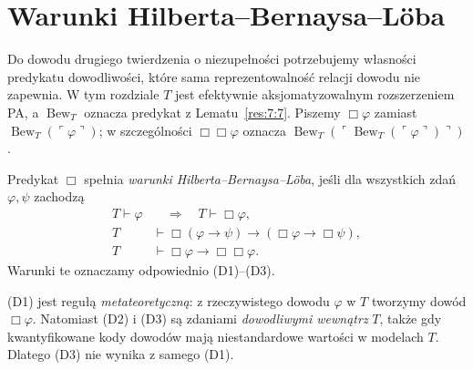 \section{Warunki Hilberta--Bernaysa--Löba}\label{sec:warunki-hbl}
Do dowodu drugiego twierdzenia o niezupełności potrzebujemy własności predykatu dowodliwości, które sama reprezentowalność relacji dowodu nie zapewnia. W tym rozdziale $T$ jest efektywnie aksjomatyzowalnym rozszerzeniem PA, a $\operatorname{Bew}_T$ oznacza predykat z Lematu~\ref{res:7:7}. Piszemy $\Box\varphi$ zamiast $\operatorname{Bew}_T(\ulcorner\varphi\urcorner)$; w szczególności $\Box\Box\varphi$ oznacza $\operatorname{Bew}_T(\ulcorner\operatorname{Bew}_T(\ulcorner\varphi\urcorner)\urcorner)$.

\begin{definicja}\label{res:11:1}
Predykat $\Box$ spełnia \emph{warunki Hilberta--Bernaysa--Löba}, jeśli dla wszystkich zdań $\varphi,\psi$ zachodzą
\begin{align}
T\vdash\varphi&\quad\Longrightarrow\quad T\vdash\Box\varphi,\label{eq:11:1}\\
T&\vdash\Box(\varphi\to\psi)\to(\Box\varphi\to\Box\psi),\label{eq:11:2}\\
T&\vdash\Box\varphi\to\Box\Box\varphi.\label{eq:11:3}
\end{align}
Warunki te oznaczamy odpowiednio (D1)--(D3).
\end{definicja}

\begin{uwaga}\label{res:11:2}
(D1) jest regułą \emph{metateoretyczną}: z rzeczywistego dowodu $\varphi$ w $T$ tworzymy dowód $\Box\varphi$. Natomiast (D2) i (D3) są zdaniami \emph{dowodliwymi wewnątrz} $T$, także gdy kwantyfikowane kody dowodów mają niestandardowe wartości w modelach $T$. Dlatego (D3) nie wynika z samego (D1).
\end{uwaga}

